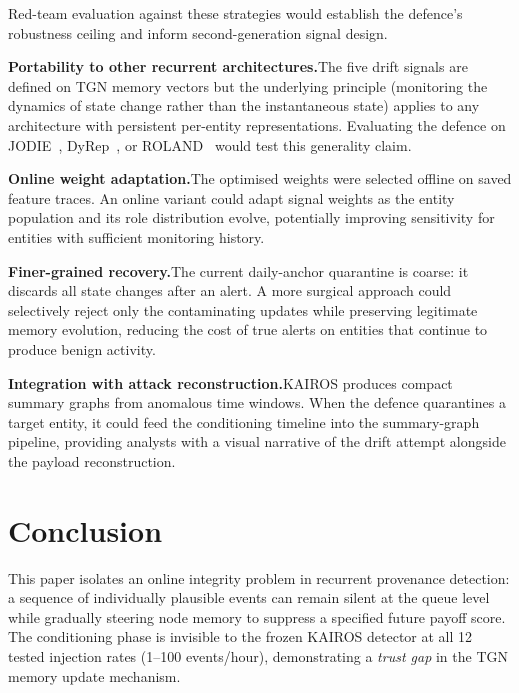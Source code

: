 \documentclass[10pt,twocolumn]{article}
\begin{document}
Red-team evaluation against these strategies would establish the
defence's robustness ceiling and inform second-generation signal design.

\textbf{Portability to other recurrent architectures.}\quad The five
drift signals are defined on TGN memory vectors but the underlying
principle (monitoring the dynamics of state change rather than the
instantaneous state) applies to any architecture with persistent
per-entity representations.  Evaluating the defence on
JODIE~\cite{kumar2019jodie}, DyRep~\cite{trivedi2019dyrep}, or
ROLAND~\cite{you2022roland} would test this generality claim.

\textbf{Online weight adaptation.}\quad The optimised weights were
selected offline on saved feature traces.  An online variant could adapt
signal weights as the entity population and its role distribution evolve,
potentially improving sensitivity for entities with sufficient monitoring
history.

\textbf{Finer-grained recovery.}\quad The current daily-anchor quarantine
is coarse: it discards all state changes after an alert.  A more surgical
approach could selectively reject only the contaminating updates while
preserving legitimate memory evolution, reducing the cost of true alerts
on entities that continue to produce benign activity.

\textbf{Integration with attack reconstruction.}\quad KAIROS produces
compact summary graphs from anomalous time windows.  When the defence
quarantines a target entity, it could feed the conditioning timeline
into the summary-graph pipeline, providing analysts with a visual
narrative of the drift attempt alongside the payload reconstruction.

\section{Conclusion}
\label{sec:conclusion}

This paper isolates an online integrity problem in recurrent provenance
detection: a sequence of individually plausible events can remain silent at
the queue level while gradually steering node memory to suppress a specified
future payoff score.  The conditioning phase is invisible to the frozen
KAIROS detector at all 12 tested injection rates (1--100 events/hour),
demonstrating a \emph{trust gap} in the TGN memory update mechanism.
\end{document}
